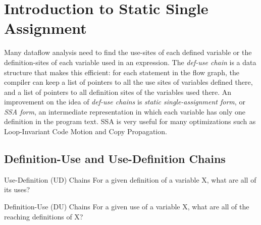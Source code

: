 \newpage



\section{Introduction to Static Single Assignment}

Many dataflow analysis need to find the use-sites of each defined variable or the definition-sites of each variable used in an expression.
 The \textit{def-use chain} is a data structure that makes this efficient: for each statement in the flow graph,
  the compiler can keep a list of pointers to all the use sites of variables defined there, and a list of pointers 
  to all definition sites of the variables used there. An improvement on the idea of \textit{def-use chains}
   is \textit{static single-assignment form}, or \textit{SSA form}, an intermediate representation in which each variable has only one definition in the program text. SSA is very useful for many optimizations such as Loop-Invariant Code Motion and Copy Propagation.



\subsection{Definition-Use and Use-Definition Chains}


\begin{definition}{Use-Definition (UD) Chains}
	For a given definition of a variable X, what are all of its uses?

\end{definition}



\begin{definition}{Definition-Use (DU) Chains}
	For a given use of a variable X, what are all of the reaching definitions of X?

\end{definition}




